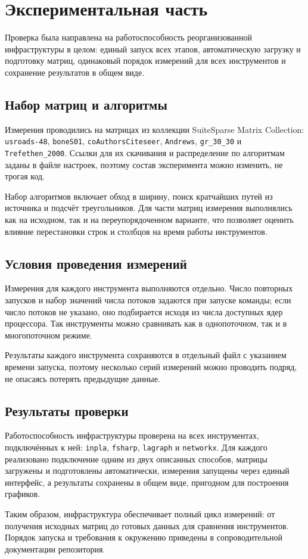 
\section{Экспериментальная часть}
\label{sec:experiment}

Проверка была направлена на работоспособность реорганизованной инфраструктуры в целом: единый запуск всех этапов, автоматическую загрузку и подготовку матриц, одинаковый порядок измерений для всех инструментов и сохранение результатов в общем виде.

\subsection{Набор матриц и алгоритмы}
\label{subsec:matrices}

Измерения проводились на матрицах из коллекции SuiteSparse Matrix Collection: \texttt{usroads-48}, \texttt{boneS01}, \texttt{coAuthorsCiteseer}, \texttt{Andrews}, \texttt{gr\_30\_30} и \texttt{Trefethen\_2000}. Ссылки для их скачивания и распределение по алгоритмам заданы в файле настроек, поэтому состав эксперимента можно изменить, не трогая код.

Набор алгоритмов включает обход в ширину, поиск кратчайших путей из источника и подсчёт треугольников. Для части матриц измерения выполнялись как на исходном, так и на переупорядоченном варианте, что позволяет оценить влияние перестановки строк и столбцов на время работы инструментов.

\subsection{Условия проведения измерений}
\label{subsec:conditions}

Измерения для каждого инструмента выполняются отдельно. Число повторных запусков и набор значений числа потоков задаются при запуске команды; если число потоков не указано, оно подбирается исходя из числа доступных ядер процессора. Так инструменты можно сравнивать как в однопоточном, так и в многопоточном режиме.

Результаты каждого инструмента сохраняются в отдельный файл с указанием времени запуска, поэтому несколько серий измерений можно проводить подряд, не опасаясь потерять предыдущие данные.

\subsection{Результаты проверки}
\label{subsec:results}

Работоспособность инфраструктуры проверена на всех инструментах, подключённых к ней: \texttt{inpla}, \texttt{fsharp}, \texttt{lagraph} и \texttt{networkx}. Для каждого реализовано подключение одним из двух описанных способов, матрицы загружены и подготовлены автоматически, измерения запущены через единый интерфейс, а результаты сохранены в общем виде, пригодном для построения графиков.

Таким образом, инфраструктура обеспечивает полный цикл измерений: от получения исходных матриц до готовых данных для сравнения инструментов. Порядок запуска и требования к окружению приведены в сопроводительной документации репозитория.
